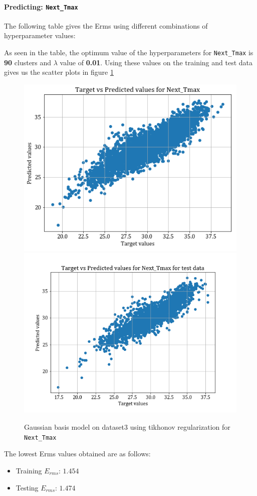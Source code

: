 \documentclass[12pt,a4paper]{article}
\def\tt#1{\texttt{#1}}
\begin{document}
\paragraph{Predicting: \tt{Next\_Tmax}}
The following table gives the Erms using different combinations of hyperparameter values:


As seen in the table, the optimum value of the hyperparameters for  \tt{Next\_Tmax} is \textbf{90} clusters and $\lambda$ value of \textbf{0.01}. Using these values on the training and test data gives us the scatter plots in figure \ref{fig:ds3_tikh_max}
\begin{figure}
    \centering
    \includegraphics[scale=0.4]{images/train_ds3_tikh_max.png}
    \includegraphics[scale=0.4]{images/test_ds3_tikh_max.png}

    \caption{Gaussian basis model on dataset3 using tikhonov regularization for \tt{Next\_Tmax}}
    \label{fig:ds3_tikh_max}
\end{figure}
The lowest Erms values obtained are as follows:
\begin{itemize}
    \itemsep0em
    \item Training $E_{rms}$: $1.454$
    \item Testing $E_{rms}$: $1.474$
\end{itemize}
\end{document}
